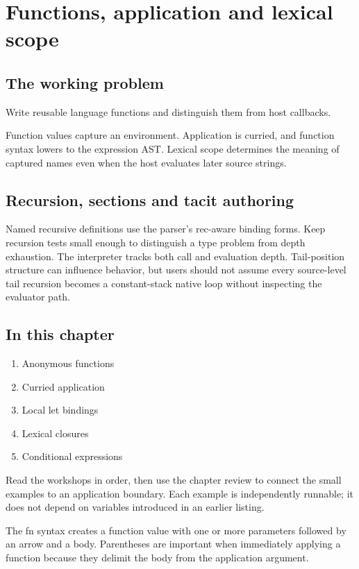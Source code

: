 \chapter{Functions, application and lexical scope}\label{ch:15}
\section*{The working problem}
Write reusable language functions and distinguish them from host callbacks.

Function values capture an environment. Application is curried, and function syntax lowers to the expression AST. Lexical scope determines the meaning of captured names even when the host evaluates later source strings.

\section*{Recursion, sections and tacit authoring}
Named recursive definitions use the parser's rec-aware binding forms. Keep recursion tests small enough to distinguish a type problem from depth exhaustion. The interpreter tracks both call and evaluation depth. Tail-position structure can influence behavior, but users should not assume every source-level tail recursion becomes a constant-stack native loop without inspecting the evaluator path.

\section*{In this chapter}
\begin{enumerate}
\item Anonymous functions
\item Curried application
\item Local let bindings
\item Lexical closures
\item Conditional expressions
\end{enumerate}
Read the workshops in order, then use the chapter review to connect the small examples to an application boundary. Each example is independently runnable; it does not depend on variables introduced in an earlier listing.

\clearpage
{}
The fn syntax creates a function value with one or more parameters followed by an arrow and a body. Parentheses are important when immediately applying a function because they delimit the body from the application argument.

